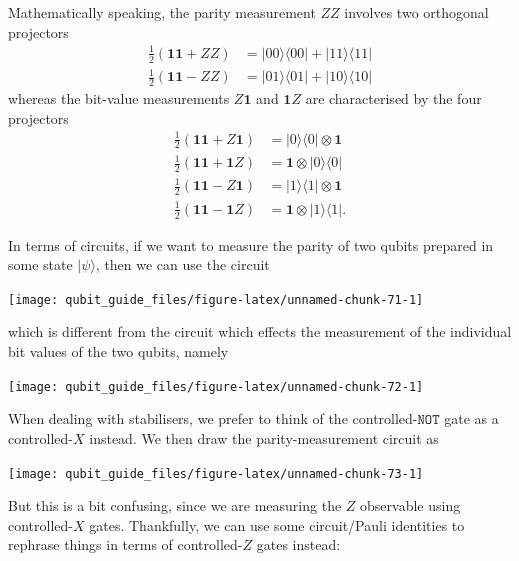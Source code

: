 \documentclass[fleqn,a4paper]{article}
\theoremstyle{definition}
\theoremstyle{definition}
\theoremstyle{definition}
\theoremstyle{definition}
\theoremstyle{remark}
\begin{document}
Mathematically speaking, the parity measurement \(ZZ\) involves two orthogonal projectors
\[
  \begin{aligned}
    \frac{1}{2}(\mathbf{1}\mathbf{1}+ZZ)
    &= |00\rangle\langle 00|+|11\rangle\langle 11|
  \\\frac{1}{2}(\mathbf{1}\mathbf{1}-ZZ)
    &= |01\rangle\langle 01|+|10\rangle\langle 10|
  \end{aligned}
\]
whereas the bit-value measurements \(Z\mathbf{1}\) and \(\mathbf{1}Z\) are characterised by the four projectors
\[
  \begin{aligned}
    \frac{1}{2}(\mathbf{1}\mathbf{1}+Z\mathbf{1})
    &= |0\rangle\langle 0|\otimes\mathbf{1}
  \\\frac{1}{2}(\mathbf{1}\mathbf{1}+\mathbf{1}Z)
    &= \mathbf{1}\otimes|0\rangle\langle 0|
  \\\frac{1}{2}(\mathbf{1}\mathbf{1}-Z\mathbf{1})
    &= |1\rangle\langle 1|\otimes\mathbf{1}
  \\\frac{1}{2}(\mathbf{1}\mathbf{1}-\mathbf{1}Z)
    &= \mathbf{1}\otimes|1\rangle\langle 1|.
  \end{aligned}
\]

In terms of circuits, if we want to measure the parity of two qubits prepared in some state \(|\psi\rangle\), then we can use the circuit

\begin{center}\texttt{[image: qubit\_guide\_files/figure-latex/unnamed-chunk-71-1]} \end{center}

which is different from the circuit which effects the measurement of the individual bit values of the two qubits, namely

\begin{center}\texttt{[image: qubit\_guide\_files/figure-latex/unnamed-chunk-72-1]} \end{center}

When dealing with stabilisers, we prefer to think of the controlled-\(\texttt{NOT}\) gate as a controlled-\(X\) instead.
We then draw the parity-measurement circuit as

\begin{center}\texttt{[image: qubit\_guide\_files/figure-latex/unnamed-chunk-73-1]} \end{center}

But this is a bit confusing, since we are measuring the \(Z\) observable using controlled-\(X\) gates.
Thankfully, we can use some circuit/Pauli identities to rephrase things in terms of controlled-\(Z\) gates instead:
\end{document}
